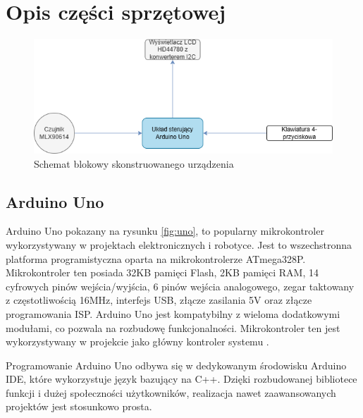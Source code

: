 \chapter{Opis części sprzętowej}

    

    \vspace{12pt}

    \begin{figure}[h!]
        \centering
        \includegraphics[width=1\textwidth]{images/schemat.png}
        \caption{Schemat blokowy skonstruowanego urządzenia} 
        \label{fig:schemat}
    \end{figure}

\section{Arduino Uno}

    Arduino Uno pokazany na rysunku \ref{fig:uno}, to popularny mikrokontroler wykorzystywany w projektach elektronicznych i robotyce. Jest to wszechstronna platforma programistyczna oparta na mikrokontrolerze ATmega328P. Mikrokontroler ten posiada 32KB pamięci Flash, 2KB pamięci RAM, 14 cyfrowych pinów wejścia/wyjścia, 6 pinów wejścia analogowego, zegar taktowany z częstotliwością 16MHz, interfejs USB, złącze zasilania 5V oraz złącze programowania ISP. Arduino Uno jest kompatybilny z wieloma dodatkowymi modułami, co pozwala na rozbudowę funkcjonalności. Mikrokontroler ten jest wykorzystywany w projekcie jako główny kontroler systemu \cite{5}.

    \vspace{12pt}

    Programowanie Arduino Uno odbywa się w dedykowanym środowisku Arduino IDE, które wykorzystuje język bazujący na C++. Dzięki rozbudowanej bibliotece funkcji i dużej społeczności użytkowników, realizacja nawet zaawansowanych projektów jest stosunkowo prosta.

